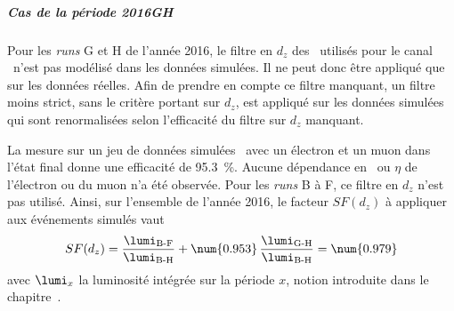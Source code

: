 \subparagraph{Cas de la période 2016GH}
Pour les \emph{runs} G et H de l'année 2016, le filtre en $d_z$ des \HLTpaths\ utilisés pour le canal \ele\mu\ n'est pas modélisé dans les données simulées.
Il ne peut donc être appliqué que sur les données réelles.
Afin de prendre en compte ce filtre manquant, un filtre moins strict, sans le critère portant sur $d_z$, est appliqué sur les données simulées qui sont renormalisées selon l'efficacité du filtre sur $d_z$ manquant.
\par
La mesure sur un jeu de données simulées \ttbar\ avec un électron et un muon dans l'état final donne une efficacité de \SI{95.3}{\%}.
Aucune dépendance en \pT\ ou $\eta$ de l'électron ou du muon n'a été observée.
Pour les \emph{runs} B à F, ce filtre en $d_z$ n'est pas utilisé.
Ainsi, sur l'ensemble de l'année 2016, le facteur $SF(d_z)$ à appliquer aux événements simulés vaut
\begin{equation}
SF(d_z) = \frac{\lumi_\text{B-F}}{\lumi_\text{B-H}} + \num{0.953}\,\frac{\lumi_\text{G-H}}{\lumi_\text{B-H}} = \num{0.979}
\end{equation}
avec $\lumi_x$ la luminosité intégrée sur la période $x$, notion introduite dans le chapitre~.

